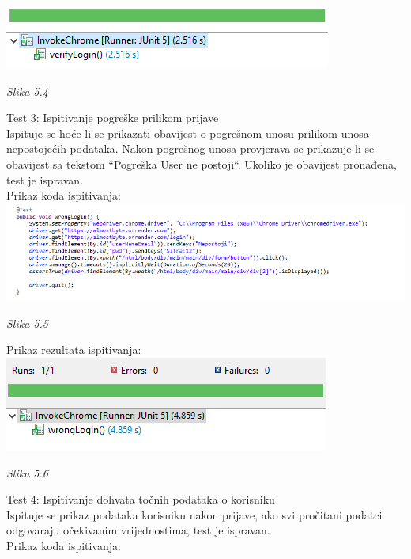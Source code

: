 \documentclass{article}
\begin{document}
	\includegraphics[width=\columnwidth]{login-true}
	\begin{center}
		\textit{Slika 5.4}
	\end{center}
	\eject
	Test 3: Ispitivanje pogreške prilikom prijave\\
	Ispituje se hoće li se prikazati obavijest o pogrešnom unosu prilikom unosa nepostojećih podataka. Nakon pogrešnog unosa provjerava se prikazuje li se obavijest sa tekstom “Pogreška User ne postoji“. Ukoliko je obavijest pronađena, test je ispravan.\\
	
	Prikaz koda ispitivanja:\\
	
	\includegraphics[width=\columnwidth]{wrongLogin}
	\begin{center}
		\textit{Slika 5.5}
	\end{center}
	Prikaz rezultata ispitivanja:\\
	
	\includegraphics[width=\columnwidth]{wrongLogin-true}
	\begin{center}
		\textit{Slika 5.6}
	\end{center}
	\eject
	Test 4: Ispitivanje dohvata točnih podataka o korisniku\\
	Ispituje se prikaz podataka korisniku nakon prijave, ako svi pročitani podatci odgovaraju očekivanim vrijednostima, test je ispravan.\\
	
	Prikaz koda ispitivanja:\\
	
\end{document}
